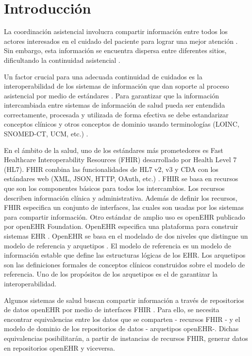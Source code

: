 \chapter{Introducción}

La coordinación asistencial involucra compartir información entre todos los actores interesados en el cuidado del paciente para lograr una mejor atención \cite{CareCoordination}. Sin embargo, esta información se encuentra dispersa entre diferentes sitios, dificultando la continuidad asistencial \cite{Indarte11}.

Un factor crucial para una adecuada continuidad de cuidados es la interoperabilidad de los sistemas de información que dan soporte al proceso asistencial por medio de estándares \cite{OPS16}. Para garantizar que la información intercambiada entre sistemas de información de salud pueda ser entendida correctamente, procesada y utilizada de forma efectiva se debe estandarizar conceptos clínicos y otros conceptos de dominio usando terminologías (LOINC, SNOMED-CT, UCM, etc.) \cite{ISO20514}.

En el ámbito de la salud, uno de los estándares más prometedores es Fast Healthcare Interoperability Resources (FHIR) desarrollado por Health Level 7 (HL7). FHIR combina las funcionalidades de HL7 v2, v3 y CDA con los estándares web (XML, JSON, HTTP, OAuth, etc.) \cite{FHIR}. FHIR se basa en recursos que son los componentes básicos para todos los intercambios. Los recursos describen información clínica y administrativa. Además de definir los recursos, FHIR especifica un conjunto de interfaces, las cuales son usadas por los sistemas para compartir información. Otro estándar de amplio uso es openEHR publicado por openEHR Foundation. OpenEHR especifica una plataforma para construir sistemas EHR \cite{openEHR}. OpenEHR se basa en el modelado de dos niveles que distingue un modelo de referencia y arquetipos \cite{Bale00}. El modelo de referencia es un modelo de información estable que define las estructuras lógicas de los EHR. Los arquetipos son las definiciones formales de conceptos clínicos construidos sobre el modelo de referencia. Uno de los propósitos de los arquetipos es el de garantizar la interoperabilidad.

Algunos sistemas de salud buscan compartir información a través de repositorios de datos openEHR por medio de interfaces FHIR \cite{Lopez16}. Para ello, se necesita encontrar equivalencias entre los datos que se comparten - recursos FHIR - y el modelo de dominio de los repositorios de datos - arquetipos openEHR-. Dichas equivalencias posibilitarán, a partir de instancias de recursos FHIR, generar datos en repositorios openEHR y viceversa.


